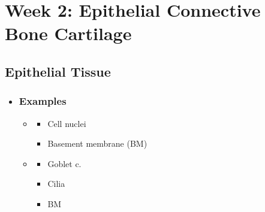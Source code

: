 \chapter{Week 2: Epithelial Connective Bone Cartilage}

\section{Epithelial Tissue}
\begin{itemize}
  \item[]
  
  \subsection{Examples}
  \begin{multicols}{2}
  \begin{itemize}
    \item {}  
    
    \begin{multicols}{2}
    \begin{itemize}
      \item Cell nuclei
      
      
      \item Basement membrane (BM)
      
    \end{itemize}
    \end{multicols}
    \item {}


     \begin{multicols}{3}
      \begin{itemize}
        \item Goblet c.
        
        
        \item Cilia
        
        
        \item BM
        

\end{itemize}
\end{multicols}
\end{itemize}
\end{multicols}
\end{itemize}
